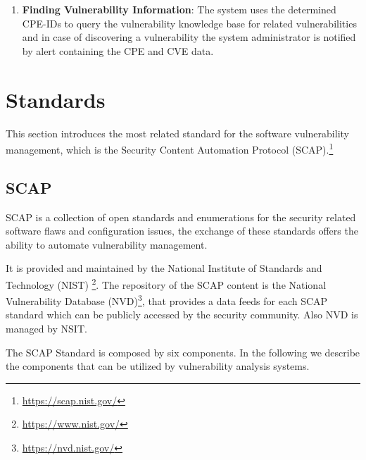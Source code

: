 \documentclass{llncs}
\begin{document}
\begin{enumerate}
   \item \textbf{Finding Vulnerability Information}: The system uses the determined CPE-IDs to query the vulnerability knowledge base for related vulnerabilities and in case of discovering a vulnerability  the system administrator is notified by alert containing the CPE and CVE data.      
   
 
 \end{enumerate}



\section{Standards}
This section introduces the most related standard for the software vulnerability management, which is the Security Content Automation Protocol (SCAP).\footnote{\url{https://scap.nist.gov/}}


\subsection{SCAP}

\par SCAP is a collection of open standards and enumerations for the security related software flaws and configuration issues, the exchange of these standards offers the ability to automate vulnerability management\cite{scap_doc}. \par   
 It is provided and maintained by the National Institute of Standards and Technology (NIST) \footnote{\url{https://www.nist.gov/}}. The repository of the SCAP content is the National Vulnerability Database (NVD)\footnote{\url{https://nvd.nist.gov/}}, that provides a data feeds for each SCAP standard which can be publicly accessed by the security community. Also NVD is managed by NSIT.
 
 The SCAP Standard is composed by six components. In the following we describe the components that can be utilized by vulnerability analysis systems\cite{scap_doc}.
 
\end{document}
